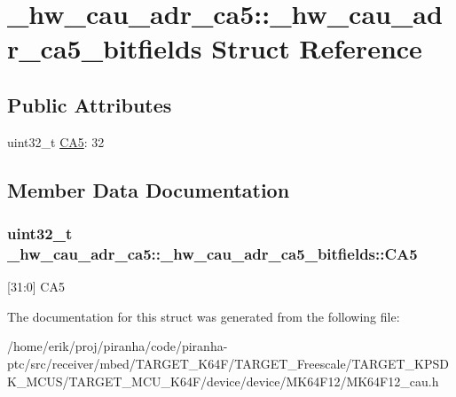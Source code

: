 \hypertarget{struct__hw__cau__adr__ca5_1_1__hw__cau__adr__ca5__bitfields}{}\section{\+\_\+hw\+\_\+cau\+\_\+adr\+\_\+ca5\+:\+:\+\_\+hw\+\_\+cau\+\_\+adr\+\_\+ca5\+\_\+bitfields Struct Reference}
\label{struct__hw__cau__adr__ca5_1_1__hw__cau__adr__ca5__bitfields}
\subsection*{Public Attributes}
\begin{DoxyCompactItemize}
\item 
uint32\+\_\+t \hyperlink{struct__hw__cau__adr__ca5_1_1__hw__cau__adr__ca5__bitfields_a34c85f536703ff7108a58c1893bc9d58}{C\+A5}\+: 32
\end{DoxyCompactItemize}


\subsection{Member Data Documentation}
\subsubsection[{\texorpdfstring{C\+A5}{CA5}}]{\setlength{\rightskip}{0pt plus 5cm}uint32\+\_\+t \+\_\+hw\+\_\+cau\+\_\+adr\+\_\+ca5\+::\+\_\+hw\+\_\+cau\+\_\+adr\+\_\+ca5\+\_\+bitfields\+::\+C\+A5}\hypertarget{struct__hw__cau__adr__ca5_1_1__hw__cau__adr__ca5__bitfields_a34c85f536703ff7108a58c1893bc9d58}{}\label{struct__hw__cau__adr__ca5_1_1__hw__cau__adr__ca5__bitfields_a34c85f536703ff7108a58c1893bc9d58}
\mbox{[}31\+:0\mbox{]} C\+A5 

The documentation for this struct was generated from the following file\+:\begin{DoxyCompactItemize}
\item 
/home/erik/proj/piranha/code/piranha-\/ptc/src/receiver/mbed/\+T\+A\+R\+G\+E\+T\+\_\+\+K64\+F/\+T\+A\+R\+G\+E\+T\+\_\+\+Freescale/\+T\+A\+R\+G\+E\+T\+\_\+\+K\+P\+S\+D\+K\+\_\+\+M\+C\+U\+S/\+T\+A\+R\+G\+E\+T\+\_\+\+M\+C\+U\+\_\+\+K64\+F/device/device/\+M\+K64\+F12/M\+K64\+F12\+\_\+cau.\+h\end{DoxyCompactItemize}
